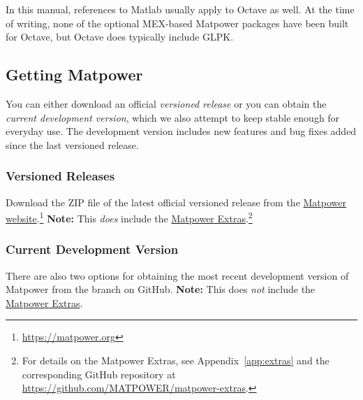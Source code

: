 \documentclass[12pt]{article}
\newcommand{\matlab}[0]{{\sc Matlab}}
\newcommand{\matpower}[0]{{\sc Matpower}}
\newcommand{\matpowerurl}[0]{https://matpower.org}
\newcommand{\matpowerextrasgithuburl}[0]{https://github.com/MATPOWER/matpower-extras}
\newcommand{\matpowerextraslink}[0]{\href{\matpowerextrasgithuburl}{\matpower{} Extras}}
\newcommand{\glpk}[0]{{GLPK}}
\newcommand{\code}[1]{{\relsize{-0.5}{\tt{{#1}}}}}  %
\numberwithin{equation}{section}
\numberwithin{table}{section}
\numberwithin{figure}{section}
\begin{document}
In this manual, references to \matlab{} usually apply to Octave as well. At the time of writing, none of the optional MEX-based \matpower{} packages have been built for Octave, but Octave does typically include \glpk{}.

\pagebreak
\subsection{Getting \matpower{}}
\label{sec:gettingmatpower}

You can either download an official \emph{versioned release} or you can obtain the \emph{current development version}, which we also attempt to keep stable enough for everyday use. The development version includes new features and bug fixes added since the last versioned release.

\subsubsection{Versioned Releases}

Download the ZIP file of the latest official versioned release from the \href{\matpowerurl}{\matpower{} website}.\footnote{\url{\matpowerurl}}
{\bf Note:} This \emph{does} include the \matpowerextraslink{}.\footnote{For details on the \matpower{} Extras, see Appendix~\ref{app:extras} and the corresponding GitHub repository at \url{\matpowerextrasgithuburl}.}

\subsubsection{Current Development Version}

There are also two options for obtaining the most recent development version
of \matpower{} from the \code{master} branch on GitHub.
{\bf Note:} This does \emph{not} include the \matpowerextraslink{}.
\end{document}
